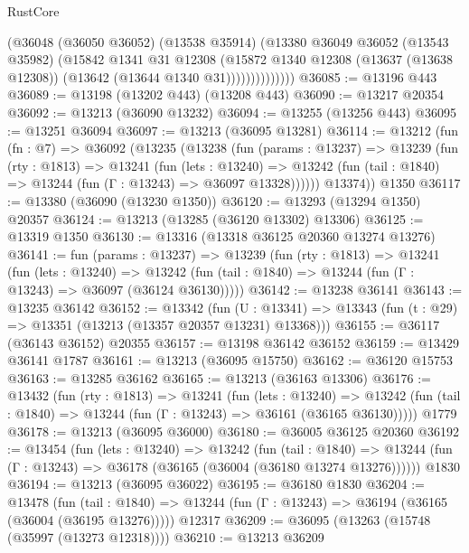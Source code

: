 \begin{lexlean}{RustCore}
\begin{coremodule}
                    (@36048
                      (@36050 @36052)
                      (@13538 @35914)
                      (@13380
                        @36049
                        @36052
                        (@13543 @35982)
                        (@15842
                          @1341
                          @31
                          @12308
                          (@15872
                            @1340
                            @12308
                            (@13637 (@13638 @12308))
                            (@13642 (@13644 @1340 @31))))))))))))))
@36085 := @13196 @443
@36089 := @13198 (@13202 @443) (@13208 @443)
@36090 := @13217 @20354
@36092 := @13213 (@36090 @13232)
@36094 := @13255 (@13256 @443)
@36095 := @13251 @36094
@36097 := @13213 (@36095 @13281)
@36114 := @13212
    (fun (fn : @7) =>
    @36092
      (@13235
        (@13238
          (fun (params : @13237) =>
          @13239
            (fun (rty : @1813) =>
            @13241
              (fun (lets : @13240) =>
              @13242 (fun (tail : @1840) => @13244 (fun (Γ : @13243) => @36097 @13328))))))
        @13374))
    @1350
@36117 := @13380 (@36090 (@13230 @1350))
@36120 := @13293 (@13294 @1350) @20357
@36124 := @13213 (@13285 (@36120 @13302) @13306)
@36125 := @13319 @1350
@36130 := @13316 (@13318 @36125 @20360 @13274 @13276)
@36141 := fun (params : @13237) =>
  @13239
    (fun (rty : @1813) =>
    @13241
      (fun (lets : @13240) =>
      @13242 (fun (tail : @1840) => @13244 (fun (Γ : @13243) => @36097 (@36124 @36130)))))
@36142 := @13238 @36141
@36143 := @13235 @36142
@36152 := @13342
    (fun (U : @13341) => @13343 (fun (t : @29) => @13351 (@13213 (@13357 @20357 @13231) @13368)))
@36155 := @36117 (@36143 @36152) @20355
@36157 := @13198 @36142 @36152
@36159 := @13429 @36141 @1787
@36161 := @13213 (@36095 @15750)
@36162 := @36120 @15753
@36163 := @13285 @36162
@36165 := @13213 (@36163 @13306)
@36176 := @13432
    (fun (rty : @1813) =>
    @13241
      (fun (lets : @13240) =>
      @13242 (fun (tail : @1840) => @13244 (fun (Γ : @13243) => @36161 (@36165 @36130)))))
    @1779
@36178 := @13213 (@36095 @36000)
@36180 := @36005 @36125 @20360
@36192 := @13454
    (fun (lets : @13240) =>
    @13242
      (fun (tail : @1840) =>
      @13244 (fun (Γ : @13243) => @36178 (@36165 (@36004 (@36180 @13274 @13276))))))
    @1830
@36194 := @13213 (@36095 @36022)
@36195 := @36180 @1830
@36204 := @13478
    (fun (tail : @1840) => @13244 (fun (Γ : @13243) => @36194 (@36165 (@36004 (@36195 @13276)))))
    @12317
@36209 := @36095 (@13263 (@15748 (@35997 (@13273 @12318))))
@36210 := @13213 @36209

\end{coremodule}
\end{lexlean}
